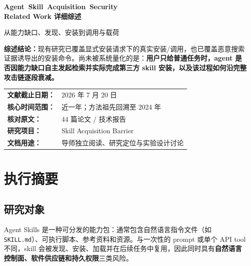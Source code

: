 \documentclass[11pt,a4paper]{ctexart}
\newcommand{\code}[1]{\texttt{#1}}
\begin{document}
\begin{titlepage}
  \pagecolor{light}
  \vspace*{2.2cm}
  {\sffamily\bfseries\fontsize{25}{33}\selectfont\color{navy}
  \mbox{Agent Skill Acquisition Security}\\[0.25cm]
  Related Work 详细综述\par}
  \vspace{0.8cm}
  {\Large\sffamily\color{slate}
  从能力缺口、发现、安装到调用与载荷\par}
  \vspace{1.5cm}

  \begin{tcolorbox}[colback=white,colframe=green,boxrule=1.1pt,arc=3mm,left=5mm,right=5mm,top=4mm,bottom=4mm]
  \large
  \textbf{综述结论：}现有研究已覆盖显式安装请求下的真实安装/调用，也已覆盖恶意搜索证据诱导出的安装命令。尚未被系统量化的是：\textbf{用户只给普通任务时，agent 是否因能力缺口自主发起检索并实际完成第三方 skill 安装，以及该过程如何沿完整攻击链逐段衰减。}
  \end{tcolorbox}

  \vfill
  \begin{tabular}{@{}ll@{}}
  \textbf{文献截止日期：} & 2026 年 7 月 20 日 \\
  \textbf{核心时间范围：} & 近一年；方法祖先回溯至 2024 年 \\
  \textbf{核对原文：} & 44 篇论文 / 技术报告 \\
  \textbf{研究项目：} & Skill Acquisition Barrier \\
  \textbf{文档用途：} & 导师独立阅读、研究定位与实验设计讨论
  \end{tabular}
  \vspace{0.8cm}
\end{titlepage}
\nopagecolor

\tableofcontents
\clearpage
{}

\section{执行摘要}

\subsection{研究对象}

Agent Skills 是一种可分发的能力包：通常包含自然语言指令文件（如 \code{SKILL.md}）、可执行脚本、参考资料和资源。与一次性的 prompt 或单个 API tool 不同，skill 会被发现、安装、加载并在后续任务中复用，因此同时具有\textbf{自然语言控制面、软件供应链和持久权限}三类风险。
\end{document}
